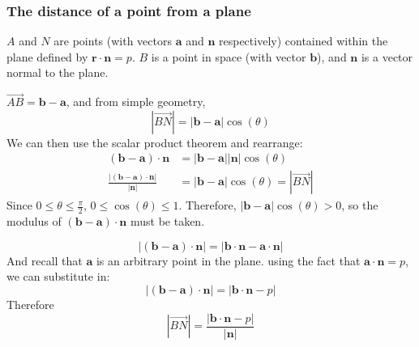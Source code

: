\documentclass[11pt, a4paper]{article}
\begin{document}
\subsubsection*{The distance of a point from a plane}
$A$ and $N$ are points (with vectors $\boldsymbol{a}$ and $\boldsymbol{n}$ respectively) contained within the plane defined by $\boldsymbol{r}\cdot\boldsymbol{n}=p$. $B$ is a point in space (with vector $\boldsymbol{b}$), and $\boldsymbol{n}$ is a vector normal to the plane.
\begin{figure}[H]
\centering
{}
\end{figure}
$\overrightarrow{AB}=\boldsymbol{b}-\boldsymbol{a}$, and from simple geometry,
\begin{equation*}
\left|\overrightarrow{BN}\right|=|\boldsymbol{b}-\boldsymbol{a}|\cos(\theta)
\end{equation*}
We can then use the scalar product theorem and rearrange:
\begin{align*}
(\boldsymbol{b}-\boldsymbol{a})\cdot\boldsymbol{n}&=|\boldsymbol{b}-\boldsymbol{a}||\boldsymbol{n}|\cos(\theta) \\
\frac{\left| (\boldsymbol{b}-\boldsymbol{a})\cdot\boldsymbol{n} \right|}{|\boldsymbol{n}|}&=|\boldsymbol{b}-\boldsymbol{a}|\cos(\theta)=\left|\overrightarrow{BN}\right|
\end{align*}
\scriptsize
Since $0\leq\theta\leq\frac{\pi}{2}$, $0\leq\cos(\theta)\leq1$. Therefore, $|\boldsymbol{b}-\boldsymbol{a}|\cos(\theta)>0$, so the modulus of $(\boldsymbol{b}-\boldsymbol{a})\cdot\boldsymbol{n}$ must be taken.
\normalsize

\begin{equation*}
\left| (\boldsymbol{b}-\boldsymbol{a})\cdot\boldsymbol{n} \right|=\left| \boldsymbol{b}\cdot\boldsymbol{n}-\boldsymbol{a}\cdot\boldsymbol{n} \right|
\end{equation*}
And recall that $\boldsymbol{a}$ is an arbitrary point in the plane. using the fact that $\boldsymbol{a}\cdot\boldsymbol{n}=p$, we can substitute in:
\begin{equation*}
\left| (\boldsymbol{b}-\boldsymbol{a})\cdot\boldsymbol{n} \right|=\left| \boldsymbol{b}\cdot\boldsymbol{n}-p \right|
\end{equation*}
Therefore
\begin{equation*}
\left|\overrightarrow{BN}\right|=\frac{\left| \boldsymbol{b}\cdot\boldsymbol{n}-p \right|}{|\boldsymbol{n}|}
\end{equation*}
\end{document}
